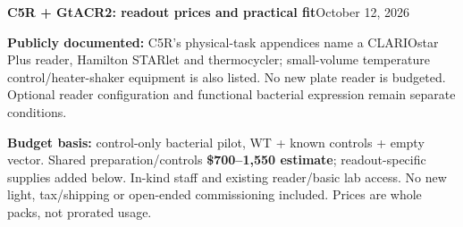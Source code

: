 \documentclass[10pt]{article}
\begin{document}
{\Large\bfseries\color{ink} C5R + GtACR2: readout prices and practical fit}\hfill October 12, 2026

\textbf{Publicly documented:} C5R's physical-task appendices name a CLARIOstar Plus reader, Hamilton STARlet and thermocycler; small-volume temperature control/heater-shaker equipment is also listed. No new plate reader is budgeted. Optional reader configuration and functional bacterial expression remain separate conditions.

\textbf{Budget basis:} control-only bacterial pilot, WT + known controls + empty vector. Shared preparation/controls \textbf{\$700--1,550 estimate}; readout-specific supplies added below. In-kind staff and existing reader/basic lab access. No new light, tax/shipping or open-ended commissioning included. Prices are whole packs, not prorated usage.
\end{document}
